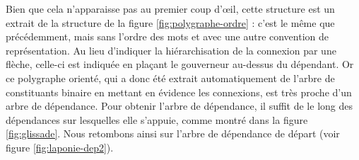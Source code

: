 Bien que cela n’apparaisse pas au premier coup d’œil, cette structure est un extrait de la structure de la figure \ref{fig:polygraphe-ordre} : c’est le même  que précédemment, mais sans l’ordre des mots et avec une autre convention de représentation. Au lieu d’indiquer la hiérarchisation de la connexion par une flèche, celle-ci est indiquée en plaçant le gouverneur au-dessus du dépendant. Or ce polygraphe orienté, qui a donc été extrait automatiquement de l’arbre de constituants binaire en mettant en évidence les connexions, est très proche d’un arbre de dépendance. Pour obtenir l’arbre de dépendance, il suffit de  le long des dépendances sur lesquelles elle s’appuie, comme montré dans la figure \ref{fig:glissade}. Nous retombons ainsi sur l'arbre de dépendance de départ (voir figure \ref{fig:laponie-dep2}).


